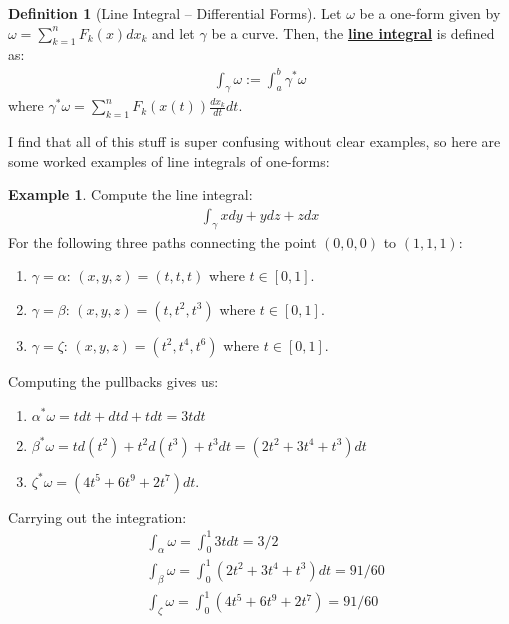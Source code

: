 \documentclass[11pt]{scrartcl}
\theoremstyle{definition}
\newtheorem{definition}{Definition}
\newtheorem{ex}{Example}
\theoremstyle{remark}
\newcommand{\dfn}[1]{\textbf{\underline{#1}}}
\newcommand{\idx}[2]{\int_{#1}^{#2}}
\begin{document}
{\begin{definition}[Line Integral -- Differential Forms]
	Let $\omega$ be a one-form given by $\omega = \sum_{k=1}^n F_k(x) dx_k$ and let $\gamma$ be a curve. Then, the \dfn{line integral} is defined as: 
	\begin{align}
		\idx{\gamma}{}\omega := \idx{a}{b} \gamma^* \omega 	
	\end{align}
	where $\gamma^* \omega = \sum_{k=1}^n F_k(x(t)) \frac{dx_k}{dt} dt$. 
\end{definition}
I find that all of this stuff is super confusing without clear examples, so here are some worked examples of line integrals of one-forms: 

\begin{ex}
	Compute the line integral: 
	\begin{align*}
		\idx{\gamma}{} xdy + y dz + zdx 
	\end{align*}
For the following three paths connecting the point $(0,0,0)$ to $(1,1,1)$: 
\begin{enumerate}[noitemsep]
	\item $\gamma = \alpha$: $(x,y,z) = (t,t,t)$ where $t \in [0,1]$. 
	\item $\gamma = \beta$: $(x,y,z) = (t,t^2, t^3)$ where $t \in [0,1]$. 
	\item $\gamma = \zeta$: $(x,y,z) = (t^2, t^4, t^6)$ where $t \in [0,1]$. 
\end{enumerate}
Computing the pullbacks gives us: 
\begin{enumerate}[noitemsep]
	\item $\alpha^* \omega = tdt + dtd + tdt = 3tdt$ 
	\item $\beta^* \omega = td(t^2) + t^2 d(t^3) + t^3 dt = (2t^2 + 3t^4 + t^3) dt $
	\item $\zeta^* \omega = (4t^5 + 6t^9 + 2t^7)dt$. 
\end{enumerate}
Carrying out the integration: 
\begin{align*}
	& \idx{\alpha}{} \omega = \idx{0}{1} 3tdt = 3/2 \\
	& \idx{\beta}{} \omega = \idx{0}{1} (2t^2 + 3t^4 + t^3)dt = 91/60 \\
	& \idx{\zeta}{} \omega = \idx{0}{1} (4t^5 + 6t^9 + 2t^7) = 91/60 
\end{align*}
\end{ex}

}
\end{document}
